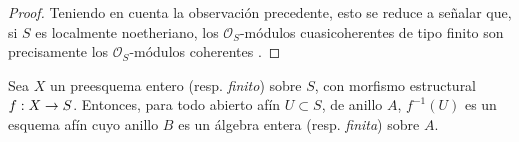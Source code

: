 \documentclass[oneside,10pt]{amsart}
\makeatletter
\newcommand{\ega@arrow}[2]{\mathchoice{#1}{#2}{#2}{#2}}
\renewcommand{\to}{\ega@arrow{\longrightarrow}{\rightarrow}}
\let\EGAOriginalLabel\label
\renewcommand{\label}[1]{\phantomsection\EGAOriginalLabel{#1}}
\makeatother
\begin{document}
\begin{proof}
Teniendo en cuenta la observación precedente, esto se reduce a señalar que, si $S$ es localmente noetheriano, los $\mathcal{O}_S$-módulos cuasicoherentes de tipo finito son precisamente los $\mathcal{O}_S$-módulos coherentes .
\end{proof}

\begin{proposition}[6.1.4]
\label{II.6.1.4-fr}
Sea $X$ un preesquema entero \textup{(resp. \emph{finito})} sobre $S$, con morfismo estructural $f:X\to S$.
Entonces, para todo abierto afín $U\subset S$, de anillo $A$, $f^{-1}(U)$ es un esquema afín cuyo anillo $B$ es un álgebra entera \textup{(resp. \emph{finita})} sobre $A$.
\end{proposition}
\end{document}
